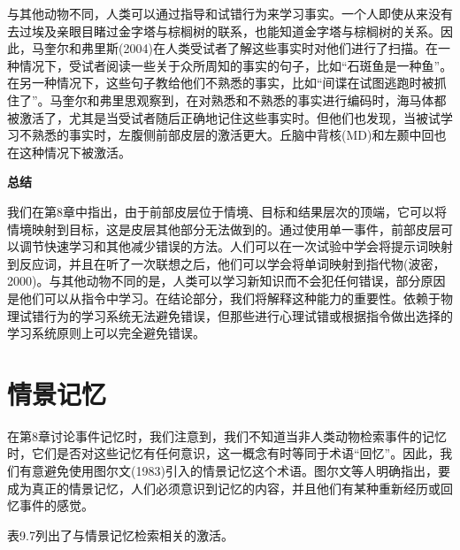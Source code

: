\par
与其他动物不同，人类可以通过指导和试错行为来学习事实。一个人即使从来没有去过埃及亲眼目睹过金字塔与棕榈树的联系，也能知道金字塔与棕榈树的关系。因此，马奎尔和弗里斯(2004)在人类受试者了解这些事实时对他们进行了扫描。在一种情况下，受试者阅读一些关于众所周知的事实的句子，比如“石斑鱼是一种鱼”。在另一种情况下，这些句子教给他们不熟悉的事实，比如“间谍在试图逃跑时被抓住了”。马奎尔和弗里思观察到，在对熟悉和不熟悉的事实进行编码时，海马体都被激活了，尤其是当受试者随后正确地记住这些事实时。但他们也发现，当被试学习不熟悉的事实时，左腹侧前部皮层的激活更大。丘脑中背核(MD)和左颞中回也在这种情况下被激活。
\par
\textbf{总结}
\par
我们在第8章中指出，由于前部皮层位于情境、目标和结果层次的顶端，它可以将情境映射到目标，这是皮层其他部分无法做到的。通过使用单一事件，前部皮层可以调节快速学习和其他减少错误的方法。人们可以在一次试验中学会将提示词映射到反应词，并且在听了一次联想之后，他们可以学会将单词映射到指代物(波密，2000)。与其他动物不同的是，人类可以学习新知识而不会犯任何错误，部分原因是他们可以从指令中学习。在结论部分，我们将解释这种能力的重要性。依赖于物理试错行为的学习系统无法避免错误，但那些进行心理试错或根据指令做出选择的学习系统原则上可以完全避免错误。
\section{情景记忆}
在第8章讨论事件记忆时，我们注意到，我们不知道当非人类动物检索事件的记忆时，它们是否对这些记忆有任何意识，这一概念有时等同于术语“回忆”。因此，我们有意避免使用图尔文(1983)引入的情景记忆这个术语。图尔文等人明确指出，要成为真正的情景记忆，人们必须意识到记忆的内容，并且他们有某种重新经历或回忆事件的感觉。
\par
表9.7列出了与情景记忆检索相关的激活。
